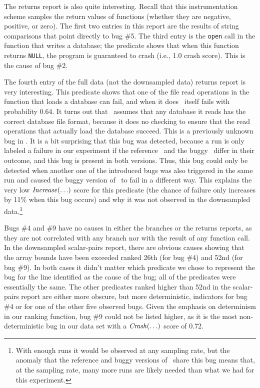 The returns report is also quite interesting.  Recall that this
instrumentation scheme samples the return values of functions (whether
they are negative, positive, or zero).  The first two entries in this
report are the results of string comparisons that point directly to bug
\#5.  The third entry is the {\tt open} call in the function that writes
a database; the predicate shows that when this function returns {\tt NULL},
the program is guaranteed to crash (i.e., 1.0 crash score).  This is the
cause of bug \#2.

The fourth entry of the full data (not the  downsampled data)
returns report is very interesting.  This predicate shows that one of
the file read operations in the function that loads a database can
fail, and when it does \moss\ itself fails with probability 0.64.
It turns out that \moss\ assumes that any database it reads has the
correct database file format, because it does no checking to ensure
that the read operations that actually load the database succeed.  This is a previously
unknown bug in \moss.  It is a bit surprising that this bug was detected,
because a run is only labeled a failure in our experiment if the
reference \moss\ and the buggy \moss\ differ in their outcome, and
this bug is present in both versions.  Thus, this bug could only be detected
when another one of the introduced bugs was also triggered in the same
run and caused the buggy version of \moss\ to fail in a different way.
This explains the very low $\mbox{\textit{Increase}}(\ldots)$ score for this
predicate (the chance of failure only increases by 11\% when this bug
occurs) and why it was not observed in the 
downsampled data.\footnote{With enough runs it would be observed at
  any sampling rate, but the anomaly that the reference and buggy
  versions of \moss\ share this bug means that, at the
   sampling rate, many more runs are likely needed
  than what we had for this experiment.}

Bugs \#4 and \#9 have no causes in either the branches or the returns
reports, as they are not correlated with any branch nor with the
result of any function call.  In the  downsampled
scalar-pairs report, there are obvious causes showing that the array
bounds have been exceeded ranked 26th (for bug \#4) and 52nd (for bug
\#9).  In both cases it didn't matter which predicate we chose to
represent the bug for the line identified as the cause of the bug; all
of the predicates were essentially the same.  The other
predicates ranked higher than 52nd in the scalar-pairs report are
either more obscure, but more deterministic, indicators for bug \#4 or
for one of the other five observed bugs.  Given the emphasis on
determinism in our ranking function, bug \#9 could not be listed
higher, as it is the most non-deterministic bug in our data set with a
$\mbox{\textit{Crash}}(\ldots)$ score of 0.72.

